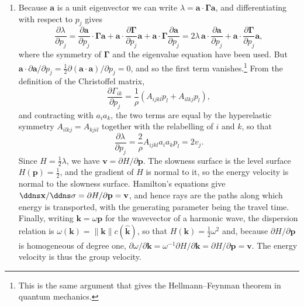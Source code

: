 \documentclass[a4paper,10pt]{paper}
\begin{document}
\begin{enumerate}
\begin{enumerate}
    \item Because $\mathbf{a}$ is a unit eigenvector we can write $\lambda=\mathbf{a}\cdot\bm{\Gamma}\mathbf{a}$, and differentiating with respect to $p_{j}$ gives
    \begin{equation*}
        \frac{\partial\lambda}{\partial p_{j}}=\frac{\partial\mathbf{a}}{\partial p_{j}}\cdot\bm{\Gamma}\mathbf{a}+\mathbf{a}\cdot\frac{\partial\bm{\Gamma}}{\partial p_{j}}\mathbf{a}+\mathbf{a}\cdot\bm{\Gamma}\frac{\partial\mathbf{a}}{\partial p_{j}}=2\lambda\,\mathbf{a}\cdot\frac{\partial\mathbf{a}}{\partial p_{j}}+\mathbf{a}\cdot\frac{\partial\bm{\Gamma}}{\partial p_{j}}\mathbf{a},
    \end{equation*}
    where the symmetry of $\bm{\Gamma}$ and the eigenvalue equation have been used. But $\mathbf{a}\cdot\partial\mathbf{a}/\partial p_{j}=\frac{1}{2}\partial(\mathbf{a}\cdot\mathbf{a})/\partial p_{j}=0$, and so the first term vanishes.\footnote{This is the same argument that gives the Hellmann--Feynman theorem in quantum mechanics.} From the definition of the Christoffel matrix,
    \begin{equation*}
        \frac{\partial\Gamma_{ik}}{\partial p_{j}}=\frac{1}{\rho}\left(A_{ijkl}p_{l}+A_{ilkj}p_{l}\right),
    \end{equation*}
    and contracting with $a_{i}a_{k}$, the two terms are equal by the hyperelastic symmetry $A_{ilkj}=A_{kjil}$ together with the relabelling of $i$ and $k$, so that
    \begin{equation*}
        \frac{\partial\lambda}{\partial p_{j}}=\frac{2}{\rho}A_{ijkl}a_{i}a_{k}p_{l}=2v_{j}.
    \end{equation*}
    Since $H=\frac{1}{2}\lambda$, we have $\mathbf{v}=\partial H/\partial\mathbf{p}$. The slowness surface is the level surface $H(\mathbf{p})=\frac{1}{2}$, and the gradient of $H$ is normal to it, so the energy velocity is normal to the slowness surface. Hamilton's equations give $\ddns\mathbf{x}/\ddns\sigma=\partial H/\partial\mathbf{p}=\mathbf{v}$, and hence rays are the paths along which energy is transported, with the generating parameter being the travel time. Finally, writing $\mathbf{k}=\omega\mathbf{p}$ for the wavevector of a harmonic wave, the dispersion relation is $\omega(\mathbf{k})=\|\mathbf{k}\|c(\hat{\mathbf{k}})$, so that $H(\mathbf{k})=\frac{1}{2}\omega^{2}$ and, because $\partial H/\partial\mathbf{p}$ is homogeneous of degree one, $\partial\omega/\partial\mathbf{k}=\omega^{-1}\partial H/\partial\mathbf{k}=\partial H/\partial\mathbf{p}=\mathbf{v}$. The energy velocity is thus the group velocity.

\end{enumerate}
\end{enumerate}
\end{document}
